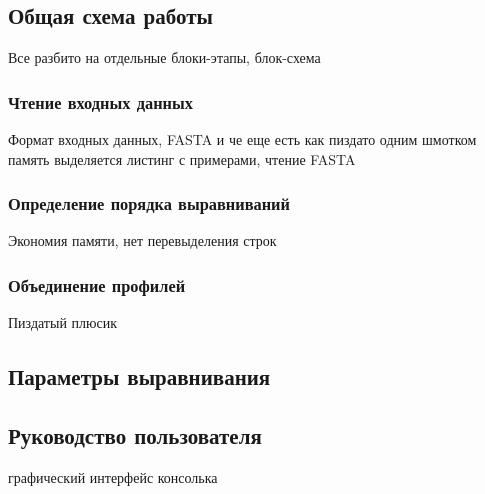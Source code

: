 \subsection[Общая схема работы]{\large Общая схема работы}
\hspace{\parindent} Все разбито на отдельные блоки-этапы, блок-схема

\subsubsection[Чтение входных данных]{\large Чтение входных данных}
\hspace{\parindent} Формат входных данных, FASTA и че еще есть
как пиздато одним шмотком память выделяется
листинг с примерами, чтение FASTA

\subsubsection[Определение порядка выравниваний]{\large Определение порядка выравниваний}
\hspace{\parindent} Экономия памяти, нет перевыделения строк

\subsubsection[Объединение профилей]{\large Объединение профилей}
\hspace{\parindent} Пиздатый плюсик

\subsection[Параметры выравнивания]{\large Параметры выравнивания}
\hspace{\parindent} 

\subsection[Руководство пользователя]{\large Руководство пользователя}
\hspace{\parindent} графический интерфейс консолька